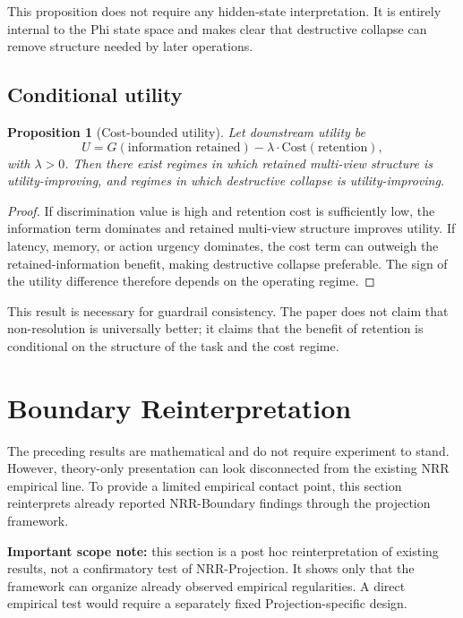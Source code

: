 \documentclass[11pt,a4paper]{article}
\newtheorem{proposition}{Proposition}
\begin{document}
This proposition does not require any hidden-state interpretation. It is entirely internal to the Phi state space and makes clear that destructive collapse can remove structure needed by later operations.

\subsection{Conditional utility}

\begin{proposition}[Cost-bounded utility]
\label{prop:utility}
Let downstream utility be
\begin{equation}
U = G(\text{information retained}) - \lambda \cdot \text{Cost}(\text{retention}),
\end{equation}
with $\lambda > 0$. Then there exist regimes in which retained multi-view structure is utility-improving, and regimes in which destructive collapse is utility-improving.
\end{proposition}

\begin{proof}
If discrimination value is high and retention cost is sufficiently low, the information term dominates and retained multi-view structure improves utility. If latency, memory, or action urgency dominates, the cost term can outweigh the retained-information benefit, making destructive collapse preferable. The sign of the utility difference therefore depends on the operating regime.
\end{proof}

This result is necessary for guardrail consistency. The paper does not claim that non-resolution is universally better; it claims that the benefit of retention is conditional on the structure of the task and the cost regime.

\section{Boundary Reinterpretation}
\label{sec:boundary}

The preceding results are mathematical and do not require experiment to stand. However, theory-only presentation can look disconnected from the existing NRR empirical line. To provide a limited empirical contact point, this section reinterprets already reported NRR-Boundary findings through the projection framework.

\textbf{Important scope note:} this section is a post hoc reinterpretation of existing results, not a confirmatory test of NRR-Projection. It shows only that the framework can organize already observed empirical regularities. A direct empirical test would require a separately fixed Projection-specific design.
\end{document}
